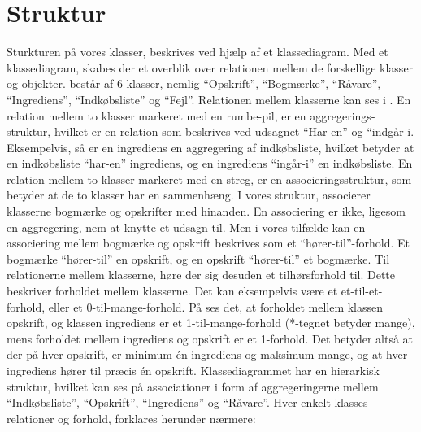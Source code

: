 \section{Struktur}
\label{sec:struktur}

Sturkturen på vores klasser, beskrives ved hjælp af et klassediagram. Med et klassediagram, skabes der et overblik over relationen mellem de forskellige klasser og objekter. \Foodl består af 6 klasser, nemlig ``Opskrift'', ``Bogmærke'', ``Råvare'', ``Ingrediens'', ``Indkøbsliste'' og ``Fejl''. Relationen mellem klasserne kan ses i . En relation mellem to klasser markeret med en rumbe-pil, er en aggregerings-struktur, hvilket er en relation som beskrives ved udsagnet ``Har-en'' og ``indgår-i. Eksempelvis, så er en ingrediens en aggregering af indkøbsliste, hvilket betyder at en indkøbsliste ``har-en'' ingrediens, og en ingrediens ``ingår-i'' en indkøbsliste. En relation mellem to klasser markeret med en streg, er en associeringsstruktur, som betyder at de to klasser har en sammenhæng. I vores struktur, associerer klasserne bogmærke og opskrifter med hinanden. En associering er ikke, ligesom en aggregering, nem at knytte et udsagn til. Men i vores tilfælde kan en associering mellem bogmærke og opskrift beskrives som et ``hører-til''-forhold. Et bogmærke ``hører-til'' en opskrift, og en opskrift ``hører-til'' et bogmærke. Til relationerne mellem klasserne, høre der sig desuden et tilhørsforhold til. Dette beskriver forholdet mellem klasserne. Det kan eksempelvis være et et-til-et-forhold, eller et 0-til-mange-forhold. På  ses det, at forholdet mellem klassen opskrift, og klassen ingrediens er et 1-til-mange-forhold (*-tegnet betyder mange), mens forholdet mellem ingrediens og opskrift er et 1-forhold. Det betyder altså at der på hver opskrift, er minimum én ingrediens og maksimum mange, og at hver ingrediens hører til præcis én opskrift. Klassediagrammet har en hierarkisk struktur, hvilket kan ses på associationer i form af aggregeringerne mellem ``Indkøbsliste'', ``Opskrift'', ``Ingrediens'' og ``Råvare''. Hver enkelt klasses relationer og forhold, forklares herunder nærmere:




